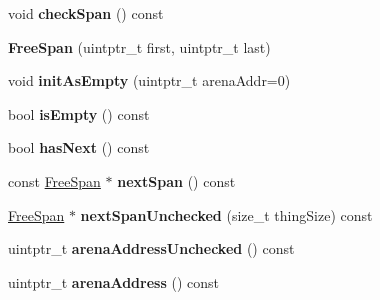 \begin{DoxyCompactItemize}
\item 
\hypertarget{structjs_1_1gc_1_1_free_span_acd7fdc7281e2a0be124c12e3779d1977}{void {\bfseries check\-Span} () const }\label{structjs_1_1gc_1_1_free_span_acd7fdc7281e2a0be124c12e3779d1977}

\item 
\hypertarget{structjs_1_1gc_1_1_free_span_a3c1b0fc18bb82769bdf95a9c8d4a2831}{{\bfseries Free\-Span} (uintptr\-\_\-t first, uintptr\-\_\-t last)}\label{structjs_1_1gc_1_1_free_span_a3c1b0fc18bb82769bdf95a9c8d4a2831}

\item 
\hypertarget{structjs_1_1gc_1_1_free_span_ae5645b1e421dc8ea6972d4c40f002b40}{void {\bfseries init\-As\-Empty} (uintptr\-\_\-t arena\-Addr=0)}\label{structjs_1_1gc_1_1_free_span_ae5645b1e421dc8ea6972d4c40f002b40}

\item 
\hypertarget{structjs_1_1gc_1_1_free_span_a49eb7e79f203b4b2807b3790ccb30dda}{bool {\bfseries is\-Empty} () const }\label{structjs_1_1gc_1_1_free_span_a49eb7e79f203b4b2807b3790ccb30dda}

\item 
\hypertarget{structjs_1_1gc_1_1_free_span_af71321cb240bb9868cd24c402e0c9fad}{bool {\bfseries has\-Next} () const }\label{structjs_1_1gc_1_1_free_span_af71321cb240bb9868cd24c402e0c9fad}

\item 
\hypertarget{structjs_1_1gc_1_1_free_span_ab8992992a81f3c8ce22d2e93d8e89cd1}{const \hyperlink{structjs_1_1gc_1_1_free_span}{Free\-Span} $\ast$ {\bfseries next\-Span} () const }\label{structjs_1_1gc_1_1_free_span_ab8992992a81f3c8ce22d2e93d8e89cd1}

\item 
\hypertarget{structjs_1_1gc_1_1_free_span_a4eca3704828304ae9174ac41ba2d3b17}{\hyperlink{structjs_1_1gc_1_1_free_span}{Free\-Span} $\ast$ {\bfseries next\-Span\-Unchecked} (size\-\_\-t thing\-Size) const }\label{structjs_1_1gc_1_1_free_span_a4eca3704828304ae9174ac41ba2d3b17}

\item 
\hypertarget{structjs_1_1gc_1_1_free_span_a112e6a2b73b871921226a78eebc4496f}{uintptr\-\_\-t {\bfseries arena\-Address\-Unchecked} () const }\label{structjs_1_1gc_1_1_free_span_a112e6a2b73b871921226a78eebc4496f}

\item 
\hypertarget{structjs_1_1gc_1_1_free_span_adc3946a88b36f8fdb59682cb8c7ec34d}{uintptr\-\_\-t {\bfseries arena\-Address} () const }\label{structjs_1_1gc_1_1_free_span_adc3946a88b36f8fdb59682cb8c7ec34d}


\end{DoxyCompactItemize}

